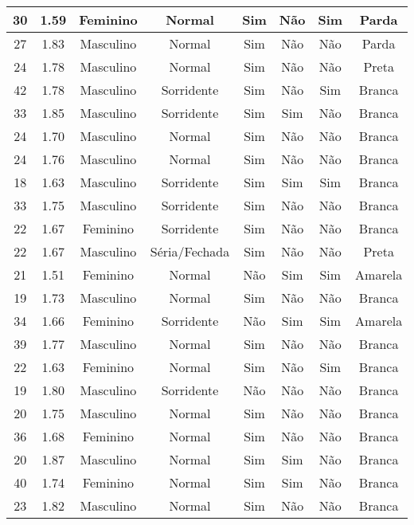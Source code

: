 \begin{table}[!ht]
\begin{tabular}{c | c | c | c | c | c | c | c}
        \hline
        30 & 1.59 & Feminino & Normal & Sim & Não & Sim & Parda \\
        \hline
        27 & 1.83 & Masculino & Normal & Sim & Não & Não & Parda \\
        \hline
        24 & 1.78 & Masculino & Normal & Sim & Não & Não & Preta \\
        \hline
        42 & 1.78 & Masculino & Sorridente & Sim & Não & Sim & Branca \\
        \hline
        33 & 1.85 & Masculino & Sorridente & Sim & Sim & Não & Branca \\
        \hline
        24 & 1.70 & Masculino & Normal & Sim & Não & Não & Branca \\
        \hline
        24 & 1.76 & Masculino & Normal & Sim & Não & Não & Branca \\
        \hline
        18 & 1.63 & Masculino & Sorridente & Sim & Sim & Sim & Branca \\
        \hline
        33 & 1.75 & Masculino & Sorridente & Sim & Não & Não & Branca \\
        \hline
        22 & 1.67 & Feminino & Sorridente & Sim & Não & Não & Branca \\
        \hline
        22 & 1.67 & Masculino & Séria/Fechada & Sim & Não & Não & Preta \\
        \hline
        21 & 1.51 & Feminino & Normal & Não & Sim & Sim & Amarela \\
        \hline
        19 & 1.73 & Masculino & Normal & Sim & Não & Não & Branca \\
        \hline
        34 & 1.66 & Feminino & Sorridente & Não & Sim & Sim & Amarela \\
        \hline
        39 & 1.77 & Masculino & Normal & Sim & Não & Não & Branca \\
        \hline
        22 & 1.63 & Feminino & Normal & Sim & Não & Sim & Branca \\
        \hline
        19 & 1.80 & Masculino & Sorridente & Não & Não & Não & Branca \\
        \hline
        20 & 1.75 & Masculino & Normal & Sim & Não & Não & Branca \\
        \hline
        36 & 1.68 & Feminino & Normal & Sim & Não & Não & Branca \\
        \hline
        20 & 1.87 & Masculino & Normal & Sim & Sim & Não & Branca \\
        \hline
        40 & 1.74 & Feminino & Normal & Sim & Sim & Não & Branca \\
        \hline
        23 & 1.82 & Masculino & Normal & Sim & Não & Não & Branca \\
        \hline
	\end{tabular}
\end{table}


